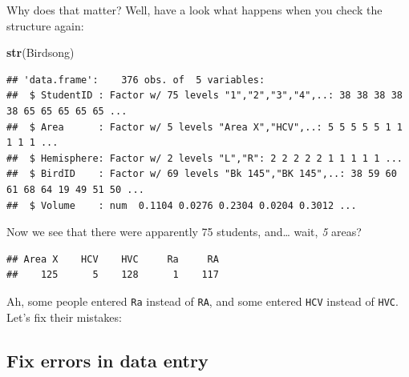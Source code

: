 \documentclass[
]{book}
\newenvironment{Shaded}{\begin{snugshade}}{\end{snugshade}}
\newcommand{\KeywordTok}[1]{\textcolor[rgb]{0.13,0.29,0.53}{\textbf{#1}}}
\newcommand{\NormalTok}[1]{#1}
\newcommand{\OperatorTok}[1]{\textcolor[rgb]{0.81,0.36,0.00}{\textbf{#1}}}
\newcommand{\StringTok}[1]{\textcolor[rgb]{0.31,0.60,0.02}{#1}}
\begin{document}
Why does that matter? Well, have a look what happens when you check the structure again:

\begin{Shaded}
\begin{Highlighting}[]
\KeywordTok{str}\NormalTok{(Birdsong)}
\end{Highlighting}
\end{Shaded}

\begin{verbatim}
## 'data.frame':    376 obs. of  5 variables:
##  $ StudentID : Factor w/ 75 levels "1","2","3","4",..: 38 38 38 38 38 65 65 65 65 65 ...
##  $ Area      : Factor w/ 5 levels "Area X","HCV",..: 5 5 5 5 5 1 1 1 1 1 ...
##  $ Hemisphere: Factor w/ 2 levels "L","R": 2 2 2 2 2 1 1 1 1 1 ...
##  $ BirdID    : Factor w/ 69 levels "Bk 145","BK 145",..: 38 59 60 61 68 64 19 49 51 50 ...
##  $ Volume    : num  0.1104 0.0276 0.2304 0.0204 0.3012 ...
\end{verbatim}

Now we see that there were apparently 75 students, and\ldots{} wait, \emph{5} areas?

\begin{Shaded}
\end{Shaded}

\begin{verbatim}
## Area X    HCV    HVC     Ra     RA 
##    125      5    128      1    117
\end{verbatim}

Ah, some people entered \texttt{Ra} instead of \texttt{RA}, and some entered \texttt{HCV} instead of \texttt{HVC}. Let's fix their mistakes:

\hypertarget{fix-errors-in-data-entry}{%
\subsection{Fix errors in data entry}\label{fix-errors-in-data-entry}}

\begin{Shaded}
\end{Shaded}
\end{document}
